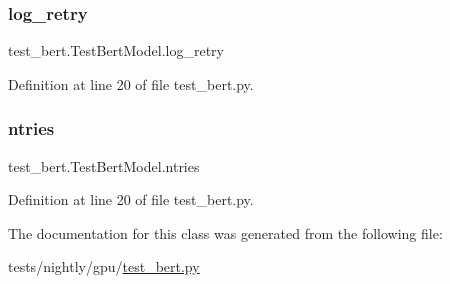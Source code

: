 \subsubsection{\texorpdfstring{log\+\_\+retry}{log\_retry}}
{\footnotesize\ttfamily test\+\_\+bert.\+Test\+Bert\+Model.\+log\+\_\+retry\hspace{0.3cm}{\ttfamily [static]}}



Definition at line 20 of file test\+\_\+bert.\+py.

\mbox{\label{classtest__bert_1_1TestBertModel_af62ecae2b9496780476aae9732a03d26}} 
\subsubsection{\texorpdfstring{ntries}{ntries}}
{\footnotesize\ttfamily test\+\_\+bert.\+Test\+Bert\+Model.\+ntries\hspace{0.3cm}{\ttfamily [static]}}



Definition at line 20 of file test\+\_\+bert.\+py.



The documentation for this class was generated from the following file\+:\begin{DoxyCompactItemize}
\item 
tests/nightly/gpu/\hyperlink{test__bert_8py}{test\+\_\+bert.\+py}\end{DoxyCompactItemize}
